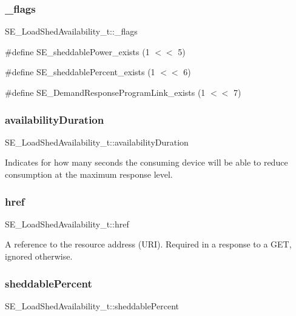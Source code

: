 \subsubsection{\texorpdfstring{\+\_\+flags}{\_flags}}
{\footnotesize\ttfamily S\+E\+\_\+\+Load\+Shed\+Availability\+\_\+t\+::\+\_\+flags}

\#define S\+E\+\_\+sheddable\+Power\+\_\+exists (1 $<$$<$ 5)

\#define S\+E\+\_\+sheddable\+Percent\+\_\+exists (1 $<$$<$ 6)

\#define S\+E\+\_\+\+Demand\+Response\+Program\+Link\+\_\+exists (1 $<$$<$ 7) \mbox{\label{group__LoadShedAvailability_ga200cb55232c00f729b128f5414767e00}} 
\subsubsection{\texorpdfstring{availability\+Duration}{availabilityDuration}}
{\footnotesize\ttfamily S\+E\+\_\+\+Load\+Shed\+Availability\+\_\+t\+::availability\+Duration}

Indicates for how many seconds the consuming device will be able to reduce consumption at the maximum response level. \mbox{\label{group__LoadShedAvailability_ga09ec435977ecddd0dc707dec6818d08e}} 
\subsubsection{\texorpdfstring{href}{href}}
{\footnotesize\ttfamily S\+E\+\_\+\+Load\+Shed\+Availability\+\_\+t\+::href}

A reference to the resource address (U\+RI). Required in a response to a G\+ET, ignored otherwise. \mbox{\label{group__LoadShedAvailability_ga884487f6c05e859588d1880d494aa5eb}} 
\subsubsection{\texorpdfstring{sheddable\+Percent}{sheddablePercent}}
{\footnotesize\ttfamily S\+E\+\_\+\+Load\+Shed\+Availability\+\_\+t\+::sheddable\+Percent}

